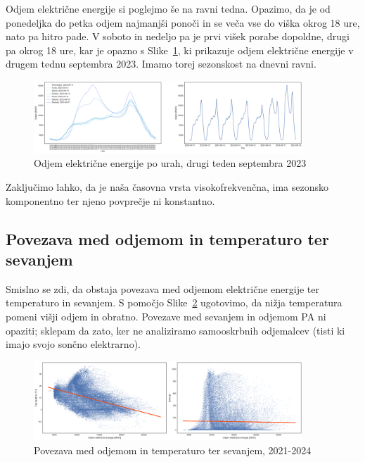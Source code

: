 \documentclass[a4paper, 11pt]{article}
\begin{document}
\noindent Odjem električne energije si poglejmo še na ravni tedna. Opazimo, da 
je od ponedeljka do petka odjem najmanjši ponoči in se veča vse do viška okrog 18 ure, nato pa hitro pade. 
V soboto in nedeljo pa je prvi višek porabe dopoldne, drugi pa okrog 18 ure, kar je opazno s Slike~\ref{fig:odjem_teden}, 
ki prikazuje odjem 
električne energije v drugem tednu septembra 2023. 
Imamo torej sezonskost na dnevni ravni.

\begin{figure}[h!]
    \centering
    \caption{Odjem električne energije po urah, drugi teden septembra 2023}\par\medskip
    \label{fig:odjem_teden}
    \includegraphics[width=0.9\textwidth]{odjem_teden.png}
\end{figure}

\noindent Zaključimo lahko, da je naša časovna vrsta visokofrekvenčna, ima sezonsko komponentno ter njeno povprečje ni konstantno.


\subsection{Povezava med odjemom in temperaturo ter sevanjem}

\noindent Smislno se zdi, da obstaja povezava med odjemom električne energije ter
temperaturo in sevanjem. S pomočjo Slike~\ref{fig:temp_sevanje} ugotovimo, da
nižja temperatura pomeni višji odjem in obratno. 
Povezave med sevanjem in odjemom PA ni opaziti; sklepam da zato, ker 
ne analiziramo samooskrbnih odjemalcev (tisti ki imajo svojo sončno elektrarno). 

\begin{figure}[h!]
    \centering
    \caption{Povezava med odjemom in temperaturo ter sevanjem, 2021-2024}\par\medskip
    \label{fig:temp_sevanje}
    \includegraphics[width=0.9\textwidth]{temp_sevanje.png}
\end{figure}
\end{document}

